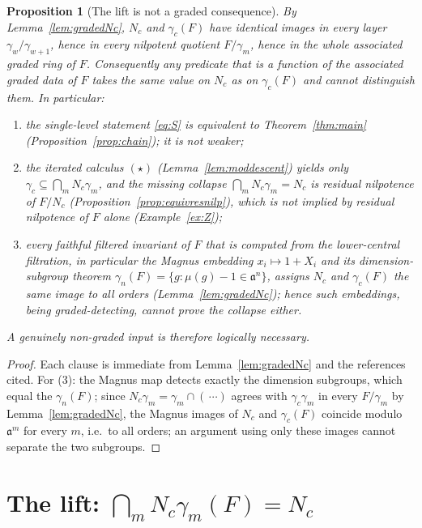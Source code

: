 \documentclass{amsart}
\newtheorem{proposition}{Proposition}
\theoremstyle{definition}
\theoremstyle{remark}
\begin{document}
\begin{proposition}[The lift is not a graded consequence]\label{prop:irreducible}
By Lemma~\ref{lem:gradedNc}, $N_c$ and $\gamma_c(F)$ have identical images in every
layer $\gamma_w/\gamma_{w+1}$, hence in every nilpotent quotient $F/\gamma_m$, hence
in the whole associated graded ring of $F$. Consequently any predicate that is a
function of the associated graded data of $F$ takes the same value on $N_c$ as on
$\gamma_c(F)$ and cannot distinguish them. In particular:
\begin{enumerate}
\item[\textup{(1)}] the single-level statement \eqref{eq:S} is \emph{equivalent} to
Theorem~\ref{thm:main} \textup{(Proposition~\ref{prop:chain})}; it is not weaker;
\item[\textup{(2)}] the iterated calculus $(\star)$ \textup{(Lemma~\ref{lem:moddescent})}
yields only $\gamma_c\subseteq\bigcap_m N_c\gamma_m$, and the missing collapse
$\bigcap_m N_c\gamma_m=N_c$ is residual nilpotence of $F/N_c$
\textup{(Proposition~\ref{prop:equivresnilp})}, which is \emph{not} implied by
residual nilpotence of $F$ alone \textup{(Example~\ref{ex:Z})};
\item[\textup{(3)}] every faithful filtered invariant of $F$ that is computed from
the lower-central filtration, in particular the Magnus embedding
$x_i\mapsto1+X_i$ and its dimension-subgroup theorem $\gamma_n(F)=\{g:\mu(g)-1\in
\mathfrak a^{n}\}$, assigns $N_c$ and $\gamma_c(F)$ the same image to all orders
\textup{(Lemma~\ref{lem:gradedNc})}; hence such embeddings, being graded-detecting,
cannot prove the collapse either.
\end{enumerate}
A genuinely non-graded input is therefore logically necessary.
\end{proposition}
\begin{proof}
Each clause is immediate from Lemma~\ref{lem:gradedNc} and the references cited.
For (3): the Magnus map detects exactly the dimension subgroups, which equal the
$\gamma_n(F)$; since $N_c\gamma_m=\gamma_m\cap(\,\cdots)$ agrees with
$\gamma_c\gamma_m$ in every $F/\gamma_m$ by Lemma~\ref{lem:gradedNc}, the Magnus
images of $N_c$ and $\gamma_c(F)$ coincide modulo $\mathfrak a^{m}$ for every $m$,
i.e.\ to all orders; an argument using only these images cannot separate the two
subgroups.
\end{proof}

\section{The lift: $\bigcap_m N_c\gamma_m(F)=N_c$}\label{sec:lift}
\end{document}
